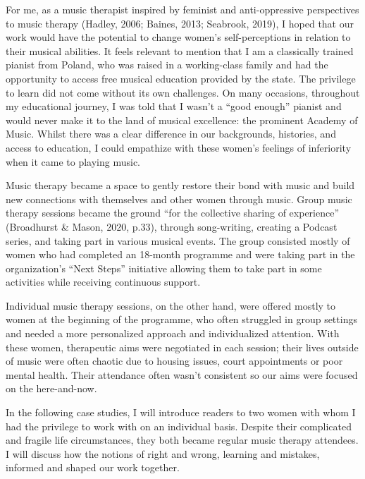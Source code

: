 \documentclass[authordate, empirical]{jote-new-article}
\begin{document}
	For me, as a music therapist inspired by feminist and anti-oppressive perspectives to music therapy (Hadley, 2006; Baines, 2013; Seabrook, 2019), I hoped that our work would have the potential to change women's self-perceptions in relation to their musical abilities. It feels relevant to mention that I am a classically trained pianist from Poland, who was raised in a working-class family and had the opportunity to access free musical education provided by the state. The privilege to learn did not come without its own challenges. On many occasions, throughout my educational journey, I was told that I wasn't a “good enough” pianist and would never make it to the land of musical excellence: the prominent Academy of Music. Whilst there was a clear difference in our backgrounds, histories, and access to education, I could empathize with these women's feelings of inferiority when it came to playing music.







	Music therapy became a space to gently restore their bond with music and build new connections with themselves and other women through music. Group music therapy sessions became the ground “for the collective sharing of experience” (Broadhurst \& Mason, 2020, p.33), through song-writing, creating a Podcast series, and taking part in various musical events. The group consisted mostly of women who had completed an 18-month programme and were taking part in the organization's “Next Steps” initiative allowing them to take part in some activities while receiving continuous support.



	Individual music therapy sessions, on the other hand, were offered mostly to women at the beginning of the programme, who often struggled in group settings and needed a more personalized approach and individualized attention. With these women, therapeutic aims were negotiated in each session; their lives outside of music were often chaotic due to housing issues, court appointments or poor mental health. Their attendance often wasn't consistent so our aims were focused on the here-and-now.







	In the following case studies, I will introduce readers to two women with whom I had the privilege to work with on an individual basis. Despite their complicated and fragile life circumstances, they both became regular music therapy attendees. I will discuss how the notions of right and wrong, learning and mistakes, informed and shaped our work together.
\end{document}
